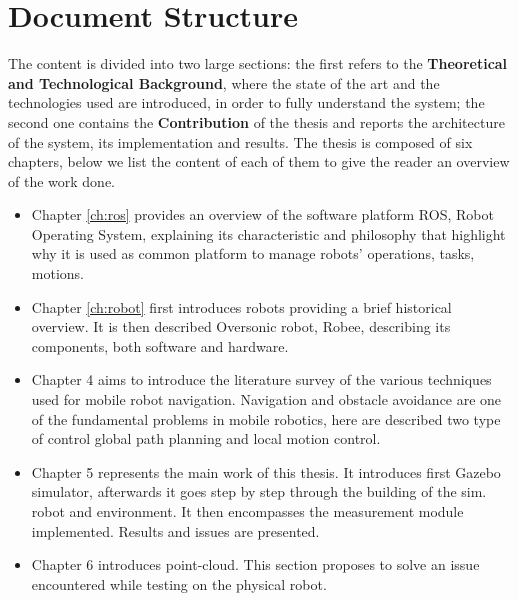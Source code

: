 \section{Document Structure}
The content is divided into two large sections: the first refers to the \textbf{Theoretical and Technological Background}, where the state of the art and the technologies used are introduced, in order to fully understand the system; the second one contains the \textbf{Contribution} of the thesis and
reports the architecture of the system, its implementation and results.
The thesis is composed of six chapters, below we list the content of each of them to give
the reader an overview of the work done.\\
\newline
\begin{itemize}
    \item Chapter \ref{ch:ros} provides an overview of the software platform ROS, Robot Operating
System, explaining its characteristic and philosophy that highlight why it is used as
common platform to manage robots’ operations, tasks, motions.
    \item Chapter \ref{ch:robot} first introduces robots providing a brief historical overview. It is then described Oversonic robot, Robee, describing its components, both software and hardware.
    \item Chapter 4 aims to introduce the literature survey of the various techniques used for
mobile robot navigation. Navigation and obstacle avoidance are one of the
fundamental problems in mobile robotics, here are described two type of control global
path planning and local motion control.
    \item Chapter 5 represents the main work of this thesis. It introduces first Gazebo simulator, afterwards it goes step by step through the building of the sim. robot and environment. It then encompasses the measurement module implemented. Results and issues are presented.
    \item Chapter 6 introduces point-cloud. This section proposes to solve an issue encountered while testing on the physical robot. 
\end{itemize}




